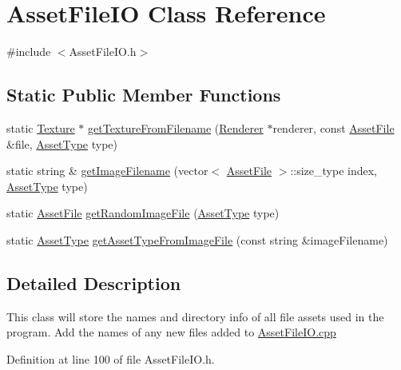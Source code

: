 \hypertarget{class_asset_file_i_o}{\section{Asset\-File\-I\-O Class Reference}
\label{class_asset_file_i_o}
}


{\ttfamily \#include $<$Asset\-File\-I\-O.\-h$>$}

\subsection*{Static Public Member Functions}
\begin{DoxyCompactItemize}
\item 
static \hyperlink{_default_config_8h_a9ca20d8445e7d830c262f5ec4bb5d1bf}{Texture} $\ast$ \hyperlink{class_asset_file_i_o_a175cb18c4a4fd4387ad54fcc6af4f273}{get\-Texture\-From\-Filename} (\hyperlink{_default_config_8h_a15987d3f97f19077ea40d858c2f0b836}{Renderer} $\ast$renderer, const \hyperlink{struct_asset_file}{Asset\-File} \&file, \hyperlink{_asset_file_i_o_8h_a72d924d1cb8e1544b6d5198e98d52ca9}{Asset\-Type} type)
\item 
static string \& \hyperlink{class_asset_file_i_o_a0e751e03e701e2b90cb8a0805f374f80}{get\-Image\-Filename} (vector$<$ \hyperlink{struct_asset_file}{Asset\-File} $>$\-::size\-\_\-type index, \hyperlink{_asset_file_i_o_8h_a72d924d1cb8e1544b6d5198e98d52ca9}{Asset\-Type} type)
\item 
static \hyperlink{struct_asset_file}{Asset\-File} \hyperlink{class_asset_file_i_o_a6aebe3a253eb43bbd40b6c99b801c893}{get\-Random\-Image\-File} (\hyperlink{_asset_file_i_o_8h_a72d924d1cb8e1544b6d5198e98d52ca9}{Asset\-Type} type)
\item 
static \hyperlink{_asset_file_i_o_8h_a72d924d1cb8e1544b6d5198e98d52ca9}{Asset\-Type} \hyperlink{class_asset_file_i_o_acc6068934ef606e383388b11fa54654b}{get\-Asset\-Type\-From\-Image\-File} (const string \&image\-Filename)
\end{DoxyCompactItemize}


\subsection{Detailed Description}
This class will store the names and directory info of all file assets used in the program. Add the names of any new files added to \hyperlink{_asset_file_i_o_8cpp}{Asset\-File\-I\-O.\-cpp} 

Definition at line 100 of file Asset\-File\-I\-O.\-h.



